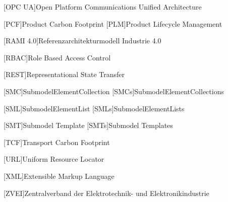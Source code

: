 {\begin{acronym}
[OPC UA]{Open Platform Communications Unified Architecture}

[PCF]{Product Carbon Footprint}
[PLM]{Product Lifecycle Management}

[RAMI 4.0]{Referenzarchitekturmodell Industrie 4.0}

[RBAC]{Role Based Access Control}

[REST]{Representational State Transfer}

[SMC]{SubmodelElementCollection}
[SMCs]{SubmodelElementCollections}

[SML]{SubmodelElementList}
[SMLs]{SubmodelElementLists}

[SMT]{Submodel Template}
[SMTs]{Submodel Templates}

[TCF]{Transport Carbon Footprint}

[URL]{Uniform Resource Locator}

[XML]{Extensible Markup Language}

[ZVEI]{Zentralverband der Elektrotechnik- und Elektronikindustrie}
\end{acronym}
}

\newpage